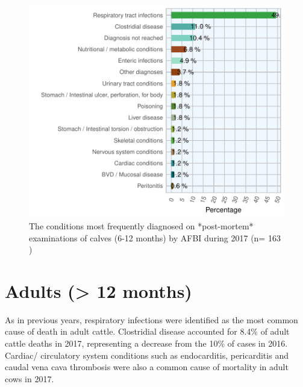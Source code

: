 \documentclass[]{book}
\begin{document}
\begin{figure}

{\centering \includegraphics{AFBI_files/figure-latex/unnamed-chunk-14-1} 

}

\caption{The conditions most frequently diagnosed on *post-mortem* examinations of  calves (6-12 months) by AFBI during 2017 (n= 163 )}\label{fig:unnamed-chunk-14}
\end{figure}

\section{Adults (\textgreater{} 12 months)}\label{adults-12-months}

As in previous years, respiratory infections were identified as the most
common cause of death in adult cattle. Clostridial disease accounted for
8.4\% of adult cattle deaths in 2017, representing a decrease from the
10\% of cases in 2016. Cardiac/ circulatory system conditions such as
endocarditis, pericarditis and caudal vena cava thrombosis were also a
common cause of mortality in adult cows in 2017.
\end{document}
